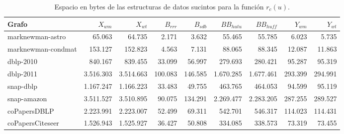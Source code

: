 \begin{table}[t]
	\caption{Espacio en bytes de las estructuras de datos sucintos para la función $r_{c}(u)$.}
	\label{table:sdslBitsRc}
	\centering
	\footnotesize
	\begin{tabular}{l||r|r||r|r||r|r||r|r}
		\toprule
		Grafo & $X_{wm}$ & $X_{wt}$ & $B_{rrr}$ & $B_{sdb}$ & $BB_{hutu}$ & $BB_{huff}$ & $Y_{wm}$ & $Y_{wt}$ \\
		\midrule
		marknewman-astro & 65.063 & 64.735 & 2.171 & 3.632 & 55.465 & 55.785 & 6.023 & 5.735 \\
        marknewman-condmat & 153.127 & 152.823 & 4.563 & 7.131 & 88.065 & 88.345 & 12.087 & 11.863 \\
        dblp-2010 & 840.167 & 839.455 & 33.099 & 56.997 & 279.693 & 280.421 & 95.287 & 95.319 \\
        dblp-2011 & 3.516.303 & 3.514.663 & 100.083 & 146.585 & 1.670.285 & 1.677.461 & 293.399 & 294.991 \\
        snap-dblp & 1.167.247 & 1.166.223 & 33.483 & 49.755 & 463.765 & 464.053 & 94.599 & 95.119 \\
        snap-amazon & 3.511.527 & 3.510.895 & 90.075 & 134.291 & 2.269.477 & 2.283.205 & 287.255 & 289.527 \\
        coPapersDBLP & 2.223.991 & 2.223.007 & 52.499 & 69.311 & 542.701 & 546.317 & 114.023 & 114.431 \\
        coPapersCiteseer & 1.526.943 & 1.525.927 & 36.427 & 50.808 & 334.085 & 338.573 & 73.319 & 73.455 \\
        \bottomrule
	\end{tabular}
\end{table}









